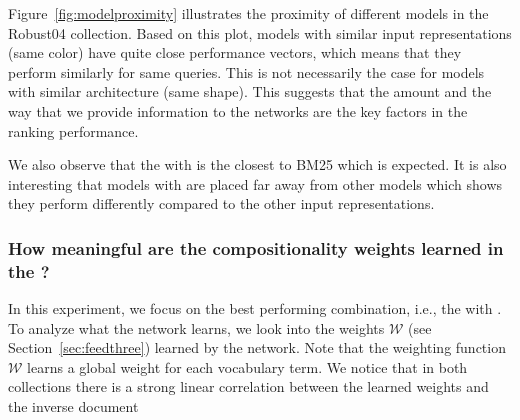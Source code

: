 Figure~\ref{fig:modelproximity} illustrates the proximity of different models in the Robust04 collection. Based on this plot, models with similar input representations (same color) have quite close performance vectors, which means that they perform similarly for same queries. This is not necessarily the case for models with similar architecture (same shape). 
This suggests that the amount and the way that we provide information to the networks are the key factors in the ranking performance. 

We also observe that the \modelone with \feedone is the closest to BM25 which is expected. 
It is also interesting that models with \feedthree are placed far away from other models which shows they perform differently compared to the other input representations.


\subsubsection{How meaningful are the compositionality weights learned in the \feedthree?}
%
In this experiment, we focus on the best performing combination, i.e., the \modelthree with \feedthree. To analyze what the network learns, we look into the weights $\mathcal{W}$ (see Section~\ref{sec:feedthree}) learned by the network. Note that the weighting function $\mathcal{W}$ learns a global weight for each vocabulary term. We notice that in both collections there is a strong linear correlation between the learned weights and the inverse document
%
